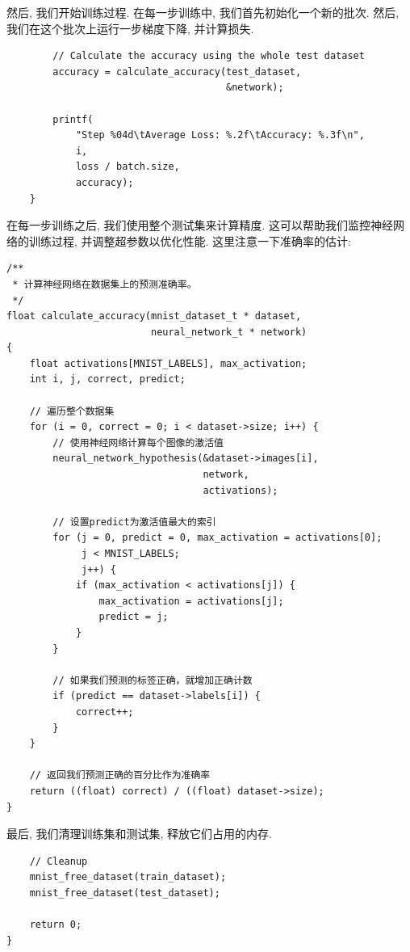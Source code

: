 \documentclass{ctexart}
\begin{document}
然后, 我们开始训练过程. 在每一步训练中, 我们首先初始化一个新的批次. 然后,
我们在这个批次上运行一步梯度下降, 并计算损失.

\begin{verbatim}  
        // Calculate the accuracy using the whole test dataset  
        accuracy = calculate_accuracy(test_dataset, 
                                      &network);  
  
        printf(
            "Step %04d\tAverage Loss: %.2f\tAccuracy: %.3f\n", 
            i, 
            loss / batch.size, 
            accuracy);  
    }  
\end{verbatim}

在每一步训练之后, 我们使用整个测试集来计算精度. 这可以帮助我们监控神经网络的训练过程, 并调整超参数以优化性能.
这里注意一下准确率的估计:

\begin{verbatim}
/**  
 * 计算神经网络在数据集上的预测准确率。  
 */  
float calculate_accuracy(mnist_dataset_t * dataset, 
                         neural_network_t * network)  
{  
    float activations[MNIST_LABELS], max_activation;  
    int i, j, correct, predict;  
  
    // 遍历整个数据集  
    for (i = 0, correct = 0; i < dataset->size; i++) {  
        // 使用神经网络计算每个图像的激活值  
        neural_network_hypothesis(&dataset->images[i], 
                                  network, 
                                  activations);  
  
        // 设置predict为激活值最大的索引  
        for (j = 0, predict = 0, max_activation = activations[0]; 
             j < MNIST_LABELS; 
             j++) {  
            if (max_activation < activations[j]) {  
                max_activation = activations[j];  
                predict = j;  
            }  
        }  
  
        // 如果我们预测的标签正确，就增加正确计数  
        if (predict == dataset->labels[i]) {  
            correct++;  
        }  
    }  
  
    // 返回我们预测正确的百分比作为准确率  
    return ((float) correct) / ((float) dataset->size);  
}  
\end{verbatim}

最后, 我们清理训练集和测试集, 释放它们占用的内存.
\begin{verbatim}  
    // Cleanup  
    mnist_free_dataset(train_dataset);  
    mnist_free_dataset(test_dataset);  
  
    return 0;  
}  
\end{verbatim}
\end{document}
